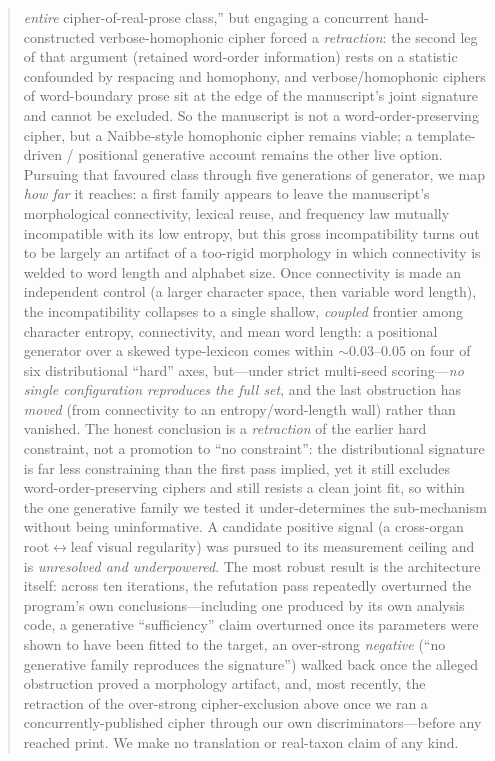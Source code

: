 \documentclass[11pt]{article}
\begin{document}
\begin{abstract}
\emph{entire} cipher-of-real-prose class,'' but engaging a concurrent hand-constructed
verbose-homophonic cipher \citep{greshko2025naibbe} forced a \emph{retraction}: the second leg
of that argument (retained word-order information) rests on a statistic confounded by
respacing and homophony, and verbose/homophonic ciphers of word-boundary prose sit at the edge
of the manuscript's joint signature and cannot be excluded. So the manuscript is not a
word-order-preserving cipher, but a Naibbe-style homophonic cipher remains viable; a
template-driven / positional generative account remains the other live option. Pursuing that favoured class through five generations of
generator, we map \emph{how far} it reaches: a first family appears to leave the
manuscript's morphological connectivity, lexical reuse, and frequency law mutually
incompatible with its low entropy, but this gross incompatibility turns out to be largely
an artifact of a too-rigid morphology in which connectivity is welded to word length and
alphabet size. Once connectivity is made an independent control (a larger character space,
then variable word length), the incompatibility collapses to a single shallow, \emph{coupled}
frontier among character entropy, connectivity, and mean word length: a positional generator
over a skewed type-lexicon comes within $\sim\!0.03$--$0.05$ on four of six distributional
``hard'' axes, but---under strict multi-seed scoring---\emph{no single configuration
reproduces the full set}, and the last obstruction has \emph{moved} (from connectivity to an
entropy/word-length wall) rather than vanished. The honest conclusion is a \emph{retraction}
of the earlier hard constraint, not a promotion to ``no constraint'': the distributional
signature is far less constraining than the first pass implied, yet it still excludes
word-order-preserving ciphers and still resists a clean joint fit, so within the one
generative family we tested it under-determines the sub-mechanism without being uninformative. A candidate positive signal (a
cross-organ root$\leftrightarrow$leaf visual regularity) was pursued to its measurement
ceiling and is \emph{unresolved and underpowered}. The most robust result is the
architecture itself: across ten iterations, the refutation pass repeatedly overturned
the program's own conclusions---including one produced by its own analysis code, a
generative ``sufficiency'' claim overturned once its parameters were shown to have been
fitted to the target, an over-strong \emph{negative} (``no generative family reproduces the
signature'') walked back once the alleged obstruction proved a morphology artifact, and,
most recently, the retraction of the over-strong cipher-exclusion above once we ran a
concurrently-published cipher through our own discriminators---before any reached print. We
make no translation or real-taxon claim of any kind.
\end{abstract}
\end{document}
